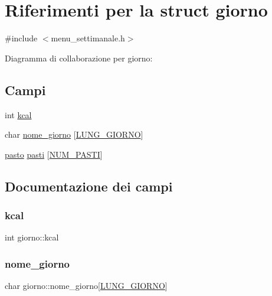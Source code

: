 \hypertarget{structgiorno}{}\section{Riferimenti per la struct giorno}
\label{structgiorno}


{\ttfamily \#include $<$menu\+\_\+settimanale.\+h$>$}



Diagramma di collaborazione per giorno\+:
\subsection*{Campi}
\begin{DoxyCompactItemize}
\item 
int \hyperlink{structgiorno_aa711a8aca060ca1639cdf94c4452b33d}{kcal}
\item 
char \hyperlink{structgiorno_a39d726518f3a70176c8bfca309c9720b}{nome\+\_\+giorno} \mbox{[}\hyperlink{menu__settimanale_8h_a89f2bc47bf642f29f85eb025d9b096c1}{L\+U\+N\+G\+\_\+\+G\+I\+O\+R\+NO}\mbox{]}
\item 
\hyperlink{menu__settimanale_8h_a9bcb2afe3bf63e9bf406a2d1e7fa8644}{pasto} \hyperlink{structgiorno_a965ec0d1d5f6c22b57f8a94932350887}{pasti} \mbox{[}\hyperlink{menu__settimanale_8h_a2000ebf33ae486fb0f53926d79ae1c7f}{N\+U\+M\+\_\+\+P\+A\+S\+TI}\mbox{]}
\end{DoxyCompactItemize}


\subsection{Documentazione dei campi}
\mbox{\label{structgiorno_aa711a8aca060ca1639cdf94c4452b33d}} 
\subsubsection{\texorpdfstring{kcal}{kcal}}
{\footnotesize\ttfamily int giorno\+::kcal}

\mbox{\label{structgiorno_a39d726518f3a70176c8bfca309c9720b}} 
\subsubsection{\texorpdfstring{nome\+\_\+giorno}{nome\_giorno}}
{\footnotesize\ttfamily char giorno\+::nome\+\_\+giorno\mbox{[}\hyperlink{menu__settimanale_8h_a89f2bc47bf642f29f85eb025d9b096c1}{L\+U\+N\+G\+\_\+\+G\+I\+O\+R\+NO}\mbox{]}}

